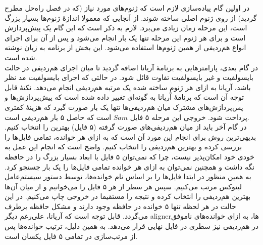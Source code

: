 در اولین گام پیاده‌سازی لازم است که ژنوم‌های مورد نیاز (که در فصل راه‌حل مطرح گردید) از روی ژنوم اصلی ساخته شوند. از آنجایی که معمولا اندازهٔ ژنوم‌ها بسیار بزرگ است، این مرحله زمان زیادی می‌برد. لازم به ذکر است که این گام یک پیش‌پردازش است و برای هر ژنوم این مرحله تنها یک بار انجام می‌شود و پس از آن برای اجرای انواع هم‌ردیفی از همین ژنوم‌ها استفاده می‌شود. این بخش از برنامه به زبان  نوشته شده است.
\\
در گام بعدی، پارامترهایی به برنامهٔ آریانا اضافه گردید تا میان اجرای هم‌ردیفی در حالت بایسولفیت و غیر بایسولفیت تفاوت قائل شود. در حالتی که اجرای بایسولفیت مد نظر باشد، آریانا به ازای هر ژنومِ ساخته شده یک مرتبه هم‌ردیفی انجام می‌دهد. نکتهٔ قابل توجه آن است که برنامهٔ آریانا به گونه‌ای تغییر داده شده است که پیش‌پردازش‌ها و پس‌پردازش‌های مشترک میان هم‌ردیفی‌ها تنها یک بار صورت گیرد که هزینهٔ کمتری پرداخت شود. خروجی این مرحله ۵ فایل $Sam$ است که حاصل ۵ بار هم‌ردیفی است.
\\
در گام آخر باید از میان هم‌ردیفی‌های صورت گرفته (۵ فایل) بهترین را انتخاب کنیم. بدیهی‌ترین روش برای انجام این مورد آن است که به ازای هر خوانده، تمامی فایل‌ها را بررسی کرده و بهترین هم‌ردیفی را انتخاب کنیم. واضح است که انجام این عمل به خودی خود امکان‌پذیر نیست، چرا که نمی‌توان ۵ فایل با ابعاد بسیار بزرگ را در حافظه نگه داشت و همچنین نمی‌توان به ازای هر خوانده تمامی فایل‌ها را یک بار جستجو کرد. به همین منظور در ابتدا فایل‌ها را بر اساس نام خوانده‌ها، توسط دستور  سیستم‌عامل لینوکس مرتب می‌کنیم. سپس هر سطر از هر ۵ فایل را می‌خوانیم و از میان آن‌ها بهترین هم‌ردیفی را انتخاب کرده و نتیجه را مستقیما در خروجی چاپ می‌کنیم. در این حالت در هر لحظه تنها ۵ خوانده در حافظه وجود دارند و مشکل حافظه برطرف می‌گردد. قابل توجه است که آریانا، علی‌رغم دیگر alignerها، به ازای خوانده‌های ناموفق در هم‌ردیفی نیز سطری در فایل نهایی قرار می‌دهد. به همین دلیل، ترتیب خوانده‌ها پس از مرتب‌سازی در تمامی ۵ فایل یکسان است.


